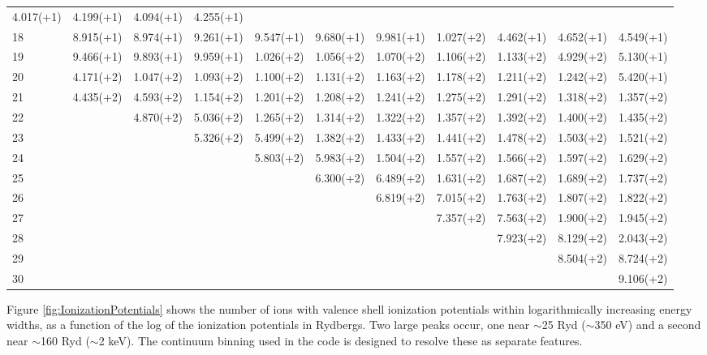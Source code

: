 \begin{table}
\begin{tabular}{lllllllllll}
4.017(+1)& 4.199(+1)& 4.094(+1)& 4.255(+1)\\
18& 8.915(+1)& 8.974(+1)& 9.261(+1)& 9.547(+1)& 9.680(+1)& 9.981(+1)&
1.027(+2)& 4.462(+1)& 4.652(+1)& 4.549(+1)\\
19& 9.466(+1)& 9.893(+1)& 9.959(+1)& 1.026(+2)& 1.056(+2)& 1.070(+2)&
1.106(+2)& 1.133(+2)& 4.929(+2)& 5.130(+1)\\
20& 4.171(+2)& 1.047(+2)& 1.093(+2)& 1.100(+2)& 1.131(+2)& 1.163(+2)&
1.178(+2)& 1.211(+2)& 1.242(+2)& 5.420(+1)\\
21& 4.435(+2)& 4.593(+2)& 1.154(+2)& 1.201(+2)& 1.208(+2)& 1.241(+2)&
1.275(+2)& 1.291(+2)& 1.318(+2)& 1.357(+2)\\
22&& 4.870(+2)& 5.036(+2)& 1.265(+2)& 1.314(+2)& 1.322(+2)& 1.357(+2)&
1.392(+2)& 1.400(+2)& 1.435(+2)\\
23&&& 5.326(+2)& 5.499(+2)& 1.382(+2)& 1.433(+2)& 1.441(+2)& 1.478(+2)&
1.503(+2)& 1.521(+2)\\
24&&&& 5.803(+2)& 5.983(+2)& 1.504(+2)& 1.557(+2)& 1.566(+2)& 1.597(+2)&
1.629(+2)\\
25&&&&& 6.300(+2)& 6.489(+2)& 1.631(+2)& 1.687(+2)& 1.689(+2)& 1.737(+2)\\
26&&&&&& 6.819(+2)& 7.015(+2)& 1.763(+2)& 1.807(+2)& 1.822(+2)\\
27&&&&&&& 7.357(+2)& 7.563(+2)& 1.900(+2)& 1.945(+2)\\
28&&&&&&&& 7.923(+2)& 8.129(+2)& 2.043(+2)\\
29&&&&&&&&& 8.504(+2)& 8.724(+2)\\
30&&&&&&&&&& 9.106(+2)\\
\hline
\end{tabular}
\end{table}

Figure \ref{fig:IonizationPotentials} shows the number of ions with valence shell ionization potentials
within logarithmically increasing energy widths, as a function of the log
of the ionization potentials in Rydbergs.  Two large peaks occur, one near
$\sim $25 Ryd ($\sim $350 eV) and a second near $\sim $160 Ryd ($\sim $2 keV).
The continuum binning used in the code is designed to resolve these as
separate features.

